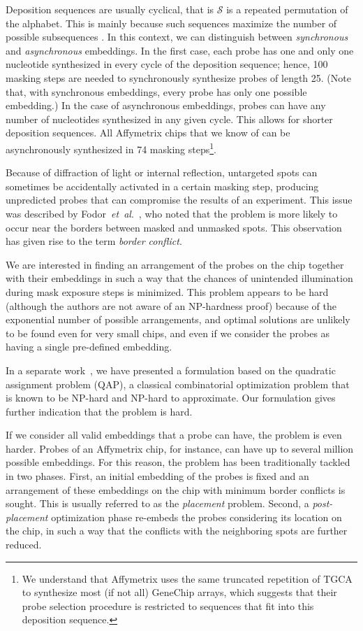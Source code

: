 \documentclass{llncs}
\begin{document}
Deposition sequences are usually cyclical, that is $\mathcal{S}$ is a repeated
permutation of the alphabet. This is mainly because such sequences maximize the
number of possible subsequences \cite{CHASE76}. In this context, we can
distinguish between \emph{synchronous} and \emph{asynchronous} embeddings. In
the first case, each probe has one and only one nucleotide synthesized in every
cycle of the deposition sequence; hence, 100 masking steps are needed to
synchronously synthesize probes of length 25.
(Note that, with synchronous embeddings, every probe has only one possible
embedding.)
In the case of asynchronous
embeddings, probes can have any number of nucleotides synthesized in any given
cycle. This allows for shorter deposition sequences. All Affymetrix chips that
we know of can be asynchronously synthesized in 74 masking steps\footnote{We
understand that Affymetrix uses the same truncated repetition of TGCA to
synthesize most (if not all) GeneChip arrays, which suggests that their probe
selection procedure is restricted to sequences that fit into this deposition
sequence.}.

Because of diffraction of light or internal reflection, untargeted spots can
sometimes be accidentally activated in a certain masking step, producing
unpredicted probes that can compromise the results of an experiment. This issue
was described by Fodor~{\it et~al}.~\cite{FODOR91}, who noted that the problem
is more likely to
occur near the borders between masked and unmasked spots. This observation has
given rise to the term \emph{border conflict}.

We are interested in finding an arrangement of the probes on the chip together
with their embeddings in such a way that the chances of unintended
illumination during mask exposure steps is minimized. This problem appears to
be hard (although the authors are not aware of an NP-hardness proof) because
of the exponential number of possible arrangements, and optimal solutions are
unlikely to be found even for very small chips, and even if we consider the probes
as having a single pre-defined embedding.

In a separate work~\cite{CARVALHO06}, we have presented a formulation based on
the quadratic assignment problem (QAP), a classical combinatorial optimization
problem that is known to be NP-hard and NP-hard to approximate. Our formulation
gives further indication that the problem is hard.

If we consider all valid embeddings that a probe can have, the problem is even
harder. Probes
of an Affymetrix chip, for instance, can have up to several million possible
embeddings. For this reason, the problem has been traditionally tackled in two
phases. First, an initial embedding of the probes is fixed and an arrangement of
these embeddings on the chip with minimum border conflicts is sought. This is
usually referred to as the \emph{placement} problem. Second, a \emph{post-placement}
optimization phase re-embeds the probes considering its location on the chip,
in such a way that the conflicts with the neighboring spots are further reduced.
\end{document}
